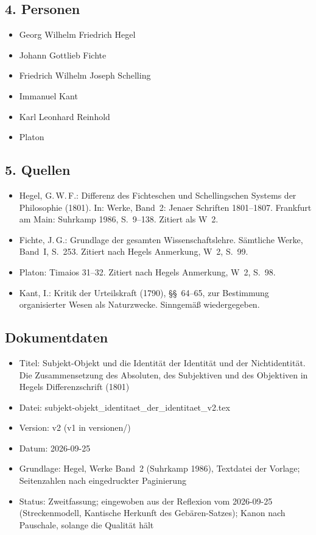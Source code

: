 \documentclass[11pt,a4paper]{article}
\begin{document}
\subsection*{4. Personen}
\begin{itemize}
\item Georg Wilhelm Friedrich Hegel
\item Johann Gottlieb Fichte
\item Friedrich Wilhelm Joseph Schelling
\item Immanuel Kant
\item Karl Leonhard Reinhold
\item Platon
\end{itemize}

\subsection*{5. Quellen}
\begin{itemize}
\item Hegel, G.\,W.\,F.: Differenz des Fichteschen und Schellingschen Systems der Philosophie (1801). In: Werke, Band~2: Jenaer Schriften 1801--1807. Frankfurt am Main: Suhrkamp 1986, S.~9--138. Zitiert als W~2.
\item Fichte, J.\,G.: Grundlage der gesamten Wissenschaftslehre. Sämtliche Werke, Band~I, S.~253. Zitiert nach Hegels Anmerkung, W~2, S.~99.
\item Platon: Timaios 31--32. Zitiert nach Hegels Anmerkung, W~2, S.~98.
\item Kant, I.: Kritik der Urteilskraft (1790), §§~64--65, zur Bestimmung organisierter Wesen als Naturzwecke. Sinngemäß wiedergegeben.
\end{itemize}

\subsection*{Dokumentdaten}
\begin{itemize}
\item Titel: Subjekt-Objekt und die Identität der Identität und der Nichtidentität. Die Zusammensetzung des Absoluten, des Subjektiven und des Objektiven in Hegels Differenzschrift (1801)
\item Datei: subjekt-objekt\_identitaet\_der\_identitaet\_v2.tex
\item Version: v2 (v1 in versionen/)
\item Datum: 2026-09-25
\item Grundlage: Hegel, Werke Band~2 (Suhrkamp 1986), Textdatei der Vorlage; Seitenzahlen nach eingedruckter Paginierung
\item Status: Zweitfassung; eingewoben aus der Reflexion vom 2026-09-25 (Streckenmodell, Kantische Herkunft des Gebären-Satzes); Kanon nach Pauschale, solange die Qualität hält
\end{itemize}
\end{document}
